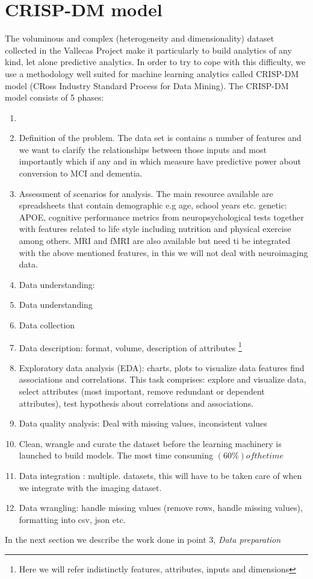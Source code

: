 \documentclass[12pt]{report}
\begin{document}
\section{CRISP-DM model}
The voluminous and complex (heterogeneity and dimensionality) dataset collected in the Vallecas Project make it particularly to build analytics of any kind, let alone predictive analytics.
In order to try to cope with this difficulty, we use a methodology well suited for machine learning analytics called CRISP-DM model (CRoss Industry Standard Process for Data Mining).
The CRISP-DM model consists of 5 phases:
\begin{enumerate}
\item
\item Definition of the problem. The data set is contains a number of features and we want to clarify the relationships between those inputs and most importantly which if any and in which measure have predictive power about conversion to MCI and dementia.
\item Assessment of scenarios for analysis. The main resource available are spreadsheets that contain demographic e.g age, school years etc. genetic: APOE, cognitive performance metrics from neuropsychological tests together with features related to life style  including nutrition and physical exercise among others. MRI and fMRI are also available but need ti be integrated with the above mentioned features, in this we will not deal with neuroimaging data.
\item Data understanding:
\item Data understanding
\item Data collection
\item Data description: format, volume, description of attributes \footnote{Here we will refer indistinctly features, attributes, inputs and dimensions}
\item Exploratory data analysis (EDA): charts, plots to visualize data features find associations and correlations. This task comprises: explore and visualize data, select attributes (most important, remove redundant or dependent attributes), test hypothesis about correlations and associations.
\item Data quality analysis: Deal with missing values, inconsistent values
\item Clean, wrangle and curate the dataset before the learning machinery is launched to build models. The most time consuming $(60\%) of the time$
\item Data integration : multiple. datasets, this will have to be taken care of when we integrate with the imaging dataset.
\item Data wrangling: handle missing values (remove rows, handle missing values), formatting into csv, json etc.

 \end{enumerate}
In the next section we describe the work done in point 3, \emph{Data preparation}
\end{document}
